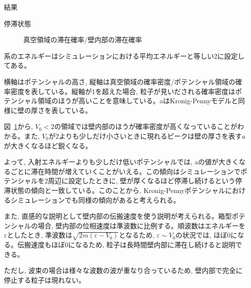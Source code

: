 \documentclass[a4paper, lualatex]{bxjsarticle}
\newcommand{\fref}[1]{図~\ref{#1}}
\begin{document}
\begin{section}{結果}
\begin{subsection}{停滞状態\label{teitais}}
\begin{figure}[h]
            \caption{真空領域の滞在確率/壁内部の滞在確率}
             \label{hako_in}
        \end{figure}
        \par 系のエネルギーはシミュレーションにおける平均エネルギーと等しい2に設定してある。
        \par 横軸はポテンシャルの高さ, 縦軸は真空領域の確率密度/ポテンシャル領域の確率密度を表している。縦軸が1を超えた場合, 粒子が見いだされる確率密度はポテンシャル領域のほうが高いことを意味している。aはKronig-Pennyモデルと同様に壁の厚さを表している。
        \par \fref{hako_in}から, $V_0<2$の領域では壁内部のほうが確率密度が高くなっていることがわかる。また, $V_0$が2よりも少しだけ小さいときに現れるピークは壁の厚さを表す$a$が大きくなるほど鋭くなる。
        \par よって, 入射エネルギーよりも少しだけ低いポテンシャルでは, aの値が大きくなるごとに滞在時間が増えていくことがいえる。この傾向はシミュレーションでポテンシャルを2周辺に設定したときに, 壁が厚くなるほど停滞し続けるという停滞状態の傾向と一致している。このことから, Kronig-Pennyポテンシャルにおけるシミュレーションでも同様の傾向があると考えられる。
        \par また, 直感的な説明として壁内部の伝搬速度を使う説明が考えられる。箱型ポテンシャルの場合, 壁内部の位相速度は準波数に比例する。順波数はエネルギーを$\varepsilon$としたとき, 準波数は$\sqrt{2m(\varepsilon - V_0)}$となるため, $\varepsilon \sim V_0$の状況では, ほぼ0になる。伝搬速度もほぼ0になるため, 粒子は長時間壁内部に滞在し続けると説明できる。
        \par ただし, 波束の場合は様々な波数の波が重なり合っているため, 壁内部で完全に停止する粒子は現れない。
    \end{subsection}


\end{section}
\end{document}
